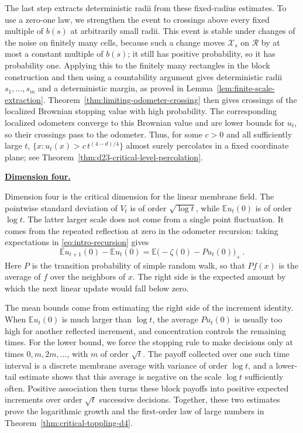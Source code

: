 \documentclass[11pt]{amsart}
\theoremstyle{plain}
\theoremstyle{definition}
\newcommand{\E}{\mathbb{E}}
\begin{document}
The last step extracts deterministic radii from these fixed-radius estimates. To use a zero-one law, we strengthen the event to crossings above every fixed multiple of $b(s)$ at arbitrarily small radii. This event is
stable under changes of the noise on finitely many cells, because such a change moves $\mathcal X_s$ on $\mathcal R$ by at most a constant multiple of $b(s)$; it still has positive probability, so it has probability one. Applying this
to the finitely many rectangles in the block construction and then using a countability argument gives deterministic radii $s_1,\ldots,s_m$ and a deterministic margin, as proved in Lemma~\ref{lem:finite-scale-extraction}. Theorem~\ref{thm:limiting-odometer-crossing} then gives crossings of the localized Brownian stopping value with high probability. The corresponding localized odometers converge to this Brownian value and are lower bounds for $u_t$, so their crossings pass to the odometer. Thus, for some
$c>0$ and all sufficiently large $t$, $\{x:u_t(x)>c\,t^{(4-d)/4}\}$
almost surely percolates in a fixed coordinate plane; see Theorem~\ref{thm:d23-critical-level-percolation}.

\smallskip
\noindent\underline{\textbf{\textup{Dimension four.}}}

Dimension four is the critical dimension for the linear membrane field. The pointwise standard deviation of $V_t$ is of order $\sqrt{\log t}$, while $\E u_t(0)$ is of order $\log t$. The latter larger scale does not come from a single point fluctuation. It comes from the repeated reflection at zero in the odometer recursion: taking expectations in \eqref{eq:intro-recursion} gives
\begin{equation}\label{eq:intro-increment}
    \E u_{t+1}(0)-\E u_t(0)=\E\bigl(-\zeta(0)-Pu_t(0)\bigr)_+\, .
\end{equation}
Here $P$ is the transition probability of simple random walk, so that $Pf(x)$ is
the average of $f$ over the neighbors of $x$. The right side is the expected amount by which the next linear update would fall below zero.

The mean bounds come from estimating the right side of the increment identity. When $\E u_t(0)$ is much larger than $\log t$, the average $Pu_t(0)$ is usually too high for another reflected increment, and
concentration controls the remaining times. For the lower bound, we force the
stopping rule to make decisions only at times $0,m,2m,\ldots$, with $m$ of
order $\sqrt t$. The payoff collected over one such time interval is a discrete membrane average with variance of order $\log t$, and a lower-tail
estimate shows that this average is negative on the scale $\log t$ sufficiently often. Positive association then turns these block payoffs into positive expected increments over order $\sqrt t$ successive decisions. Together, these two estimates prove the logarithmic growth and the first-order law of large numbers in Theorem~\ref{thm:critical-toppling-d4}.
\end{document}
